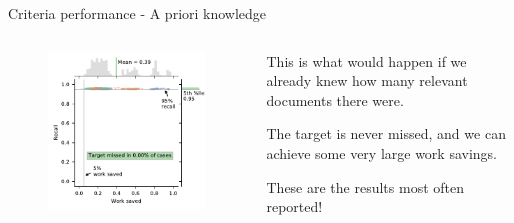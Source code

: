 \documentclass[9pt, aspectratio=169]{beamer}
\begin{document}
\begin{frame}{Criteria performance - A priori knowledge}

\begin{columns}
	\begin{column}{0.5\linewidth}
		\begin{figure}
			\includegraphics[width=\linewidth]{../manuscript/2_figs_jointplot_pf.pdf}

		\end{figure}
	\end{column}
	\begin{column}{0.5\linewidth}
		This is what would happen if we already knew how many relevant documents there were.
			
			\medskip 
			
			The target is never missed, and we can achieve some very large work savings.
			
			\medskip
			
			These are the results most often reported!

	\end{column}
\end{columns}
\end{frame}
\end{document}
